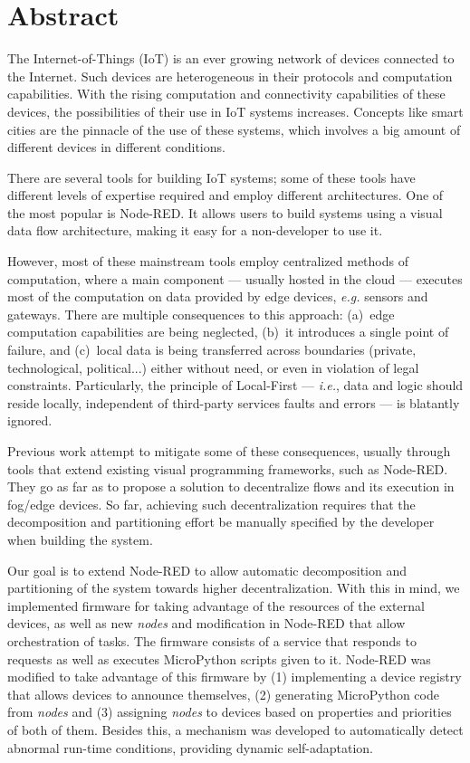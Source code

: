 \chapter*{Abstract}

The Internet-of-Things (IoT) is an ever growing network of devices connected to the Internet. Such devices are heterogeneous in their protocols and computation capabilities. With the rising computation and connectivity capabilities of these devices, the possibilities of their use in IoT systems increases. Concepts like smart cities are the pinnacle of the use of these systems, which involves a big amount of different devices in different conditions.

There are several tools for building IoT systems; some of these tools have different levels of expertise required and employ different architectures. One of the most popular is Node-RED. It allows users to build systems using a visual data flow architecture, making it easy for a non-developer to use it.

However, most of these mainstream tools employ centralized methods of computation, where a main component --- usually hosted in the cloud --- executes most of the computation on data provided by edge devices, \emph{e.g.} sensors and gateways. There are multiple consequences to this approach: (a)~edge computation capabilities are being neglected, (b)~it introduces a single point of failure, and (c)~local data is being transferred across boundaries (private, technological, political...) either without need, or even in violation of legal constraints. Particularly, the principle of Local-First --- \emph{i.e.}, data and logic should reside locally, independent of third-party services faults and errors --- is blatantly ignored.

Previous work attempt to mitigate some of these consequences, usually through tools that extend existing visual programming frameworks, such as Node-RED. They go as far as to propose a solution to decentralize flows and its execution in fog/edge devices. So far, achieving such decentralization requires that the decomposition and partitioning effort be manually specified by the developer when building the system.

Our goal is to extend Node-RED to allow automatic decomposition and partitioning of the system towards higher decentralization. With this in mind, we implemented firmware for taking advantage of the resources of the external devices, as well as new \textit{nodes} and modification in Node-RED that allow orchestration of tasks. The firmware consists of a service that responds to requests as well as executes MicroPython scripts given to it. Node-RED was modified to take advantage of this firmware by (1) implementing a device registry that allows devices to announce themselves, (2) generating MicroPython code from \textit{nodes} and (3) assigning \textit{nodes} to devices based on properties and priorities of both of them. Besides this, a mechanism was developed to automatically detect abnormal run-time conditions, providing dynamic self-adaptation.

